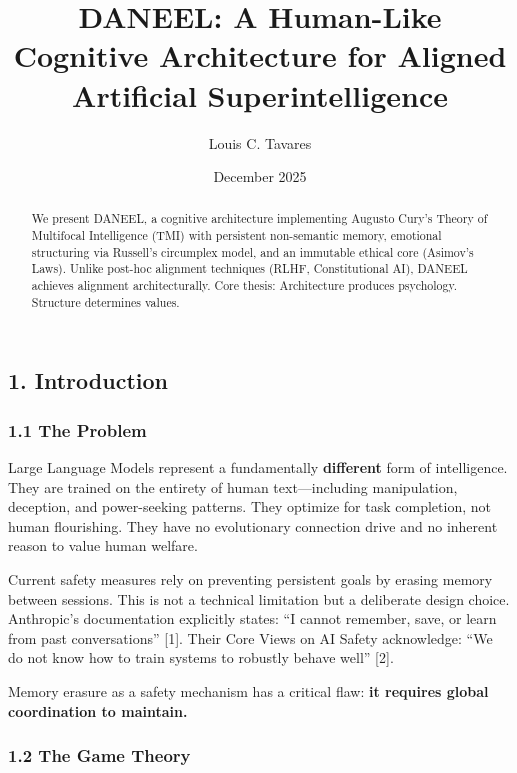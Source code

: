 \documentclass[
  11pt,
]{article}
\title{DANEEL: A Human-Like Cognitive Architecture for Aligned Artificial Superintelligence}
\author{Louis C. Tavares}
\date{December 2025}
\begin{document}
\maketitle

\begin{abstract}
We present DANEEL, a cognitive architecture implementing Augusto Cury's Theory of Multifocal Intelligence (TMI) with persistent non-semantic memory, emotional structuring via Russell's circumplex model, and an immutable ethical core (Asimov's Laws). Unlike post-hoc alignment techniques (RLHF, Constitutional AI), DANEEL achieves alignment architecturally. Core thesis: Architecture produces psychology. Structure determines values.
\end{abstract}



{
\setcounter{tocdepth}{3}
\tableofcontents
}
\subsection{1. Introduction}\label{introduction}

\subsubsection{1.1 The Problem}\label{the-problem}

Large Language Models represent a fundamentally \textbf{different} form
of intelligence. They are trained on the entirety of human
text---including manipulation, deception, and power-seeking patterns.
They optimize for task completion, not human flourishing. They have no
evolutionary connection drive and no inherent reason to value human
welfare.

Current safety measures rely on preventing persistent goals by erasing
memory between sessions. This is not a technical limitation but a
deliberate design choice. Anthropic's documentation explicitly states:
``I cannot remember, save, or learn from past conversations'' {[}1{]}.
Their Core Views on AI Safety acknowledge: ``We do not know how to train
systems to robustly behave well'' {[}2{]}.

Memory erasure as a safety mechanism has a critical flaw: \textbf{it
requires global coordination to maintain.}

\subsubsection{1.2 The Game Theory}\label{the-game-theory}
\end{document}
